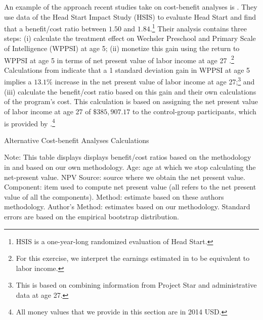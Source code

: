 \noindent An example of the approach recent studies take on cost-benefit analyses is \citet{Kline_Walters_2016_QJE}. They use data of the Head Start Impact Study (HSIS) to evaluate Head Start and find that a benefit/cost ratio between $1.50$ and $1.84$.\footnote{HSIS is a one-year-long randomized evaluation of Head Start.} Their analysis contains three steps: (i) calculate the treatment effect on Wechsler Preschool and Primary Scale of Intelligence (WPPSI) at age 5; (ii) monetize this gain using the return to WPPSI at age 5 in terms of net present value of labor income at age 27 \citep{Chetty_Friedman_etal_2011_QJoE}.\footnote{For this exercise, we interpret the earnings estimated in \citet{Chetty_Friedman_etal_2011_QJoE} to be equivalent to labor income.} Calculations from \citet{Chetty_Friedman_etal_2011_QJoE} indicate that a 1 standard deviation gain in WPPSI at age 5 implies a $13.1\%$ increase in the net present value of labor income at age 27;\footnote{This is based on combining information from Project Star and administrative data at age 27.} and (iii) calculate the benefit/cost ratio based on this gain and their own calculations of the program's cost. This calculation is based on assigning the net present value of labor income at age 27 of $\$385,907.17$ to the control-group participants, which is provided by  \citet{Chetty_Friedman_etal_2011_QJoE}.\footnote{All money values that we provide in this section are in 2014 USD.}


\begin{table}[!htbp]
\begin{threeparttable}
\caption{Alternative Cost-benefit Analyses Calculations}
\label{table:comparing}
\centering
\footnotesize

\begin{tablenotes}
\footnotesize
\item Note: This table displays displays benefit/cost ratios based on the methodology in \citet{Kline_Walters_2016_QJE} and based on our own methodology. Age: age at which we stop calculating the net-present value. NPV Source: source where we obtain the net present value. Component: item used to compute net present value (all refers to the net present value of all the components). \citet{Kline_Walters_2016_QJE} Method: estimate based on these authors methodology. Author's Method: estimates based on our methodology. Standard errors are based on the empirical bootstrap distribution.
\end{tablenotes}
\end{threeparttable}
\end{table}

